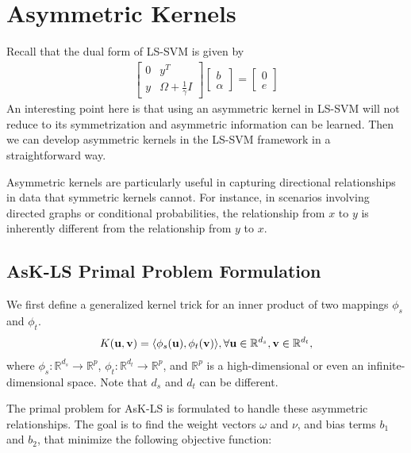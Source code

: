 \section{Asymmetric Kernels}
\label{sec:asymmetric_kernels}

Recall that the dual form of LS-SVM is given by
\begin{align*}
	\begin{bmatrix}
	0 & y^T \\
	y & \Omega + \frac{1}{\gamma} I
	\end{bmatrix}
	\begin{bmatrix}
	b \\
	\alpha
	\end{bmatrix}
	=
	\begin{bmatrix}
	0 \\
	e
	\end{bmatrix}
\end{align*}
An interesting point here is that using an asymmetric kernel in LS-SVM will not reduce to its symmetrization and asymmetric information can be learned. Then we can develop asymmetric kernels in the LS-SVM framework in a straightforward way.

Asymmetric kernels are particularly useful in capturing directional relationships in data that symmetric kernels cannot. For instance, in scenarios involving directed graphs or conditional probabilities, the relationship from $x$ to $y$ is inherently different from the relationship from $y$ to $x$.

\subsection{AsK-LS Primal Problem Formulation}
We first define a generalized kernel trick for an inner product of two mappings $\phi_s$ and $\phi_t$.
\begin{align*}
	K({\mathbf{u}}, {\mathbf{v}}) = \langle \phi_s({\mathbf{u}}), \phi_t({\mathbf{v}})\rangle, \forall {\mathbf{u}} \in \mathbb{R}^{d_s}, {\mathbf{v}} \in \mathbb{R}^{d_t},
\end{align*}
where $\phi_s: \mathbb{R}^{d_s}\to \mathbb{R}^{p}$, $\phi_t: \mathbb{R}^{d_t}\to \mathbb{R}^{p}$, and $\mathbb{R}^p$ is a high-dimensional or even an infinite-dimensional space. Note that $d_s$ and $d_t$ can be different. 

The primal problem for AsK-LS is formulated to handle these asymmetric relationships. The goal is to find the weight vectors \( \omega \) and \( \nu \), and bias terms \( b_1 \) and \( b_2 \), that minimize the following objective function:

